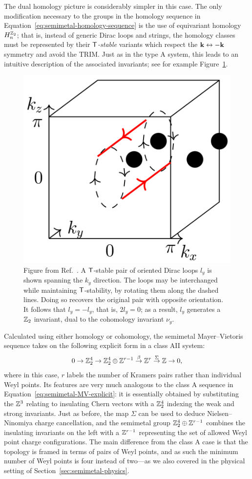 The dual homology picture is considerably simpler in this case. The only modification necessary to the groups in the homology sequence in Equation~\eqref{eq:semimetal-homology-sequence} is the use of equivariant homology $H_n^{\mathbb{Z}_2}$; %
that is, instead of generic Dirac loops and strings, the homology classes must be represented by their \emph{$\mathsf{T}$-stable} variants which respect the $\vb{k}\leftrightarrow-\vb{k}$ symmetry and avoid the TRIM. Just as in the type A system, this leads to an intuitive description of the associated invariants; see for example Figure~\ref{fig:TRS-loops}.
\begin{figure}[htb!]
	\centering
	\includegraphics[width=.5\linewidth]{Images/TRS-loops}
	\caption{Figure from Ref.~\cite{Thiang_equivariant}. A $\mathsf{T}$-stable pair of oriented Dirac loops $l_y$ is shown spanning the $k_y$ direction. The loops may be interchanged while maintaining $\mathsf{T}$-stability, by rotating them along the dashed lines. Doing so recovers the original pair with opposite orientation. It follows that $l_y=-l_y$, that is, $2l_y = 0$; as a result, $l_y$ generates a $\mathbb{Z}_2$ invariant, dual to the cohomology invariant $\nu_y$.} %
	\label{fig:TRS-loops}
\end{figure}

Calculated using either homology or cohomology, the semimetal Mayer--Vietoris sequence takes on the following explicit form in a class AII system:
\begin{equation}\label{eq:TRS-MV-explicit}
	0 \to \mathbb{Z}_2^4 \to \mathbb{Z}_2^4\oplus\mathbb{Z}^{r-1} \overset{\beta}{\to} \mathbb{Z}^r \overset{\Sigma}{\to} \mathbb{Z} \to 0,
\end{equation}
where in this case, $r$ labels the number of Kramers pairs rather than individual Weyl points. Its features are very much analogous to the class A sequence in Equation~\eqref{eq:semimetal-MV-explicit}: it is essentially obtained by substituting the $\mathbb{Z}^3$ relating to insulating Chern vectors with a $\mathbb{Z}_2^4$ indexing the weak and strong invariants. Just as before, the map $\Sigma$ can be used to deduce Nielsen--Ninomiya charge cancellation, and the semimetal group $\mathbb{Z}_2^4\oplus\mathbb{Z}^{r-1}$ combines the insulating invariants on the left with a $\mathbb{Z}^{r-1}$ representing the set of allowed Weyl point charge configurations. The main difference from the class A case is that the topology is framed in terms of pairs of Weyl points, and as such the minimum number of Weyl points is four instead of two---as we also covered in the physical setting of Section~\ref{sec:semimetal-physics}.

